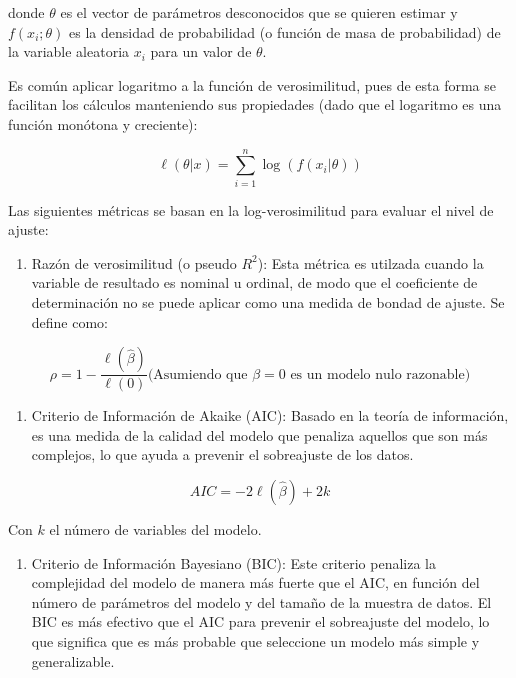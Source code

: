 \documentclass[
]{book}
\providecommand{\tightlist}{%
  \setlength{\itemsep}{0pt}\setlength{\parskip}{0pt}}
\begin{document}
donde \(θ\) es el vector de parámetros desconocidos que se quieren estimar
y \(f(x_i; θ)\) es la densidad de probabilidad (o función de masa de
probabilidad) de la variable aleatoria \(x_i\) para un valor de \(θ\).

Es común aplicar logaritmo a la función de verosimilitud, pues de esta
forma se facilitan los cálculos manteniendo sus propiedades (dado que el
logaritmo es una función monótona y creciente):

\[\ell(\theta | x) = \sum_{i=1}^{n} \log(f(x_i|\theta))\]

Las siguientes métricas se basan en la log-verosimilitud para evaluar el
nivel de ajuste:

\begin{enumerate}
\def\labelenumi{\arabic{enumi}.}
\tightlist
\item
  Razón de verosimilitud (o pseudo \(R^2\)): Esta métrica es utilzada
  cuando la variable de resultado es nominal u ordinal, de modo que el
  coeficiente de determinación no se puede aplicar como una medida de
  bondad de ajuste. Se define como:
\end{enumerate}

\[\rho = 1 - \frac{\ell(\hat{\beta})}{\ell(0)} \text{(Asumiendo que $\beta=0$ es un modelo nulo razonable)}\]

\begin{enumerate}
\def\labelenumi{\arabic{enumi}.}
\setcounter{enumi}{1}
\tightlist
\item
  Criterio de Información de Akaike (AIC): Basado en la teoría de
  información, es una medida de la calidad del modelo que penaliza
  aquellos que son más complejos, lo que ayuda a prevenir el
  sobreajuste de los datos.
\end{enumerate}

\[AIC = -2\ell({\hat{\beta}}) + 2k\]

Con \(k\) el número de variables del modelo.

\begin{enumerate}
\def\labelenumi{\arabic{enumi}.}
\setcounter{enumi}{2}
\tightlist
\item
  Criterio de Información Bayesiano (BIC): Este criterio penaliza la
  complejidad del modelo de manera más fuerte que el AIC, en función
  del número de parámetros del modelo y del tamaño de la muestra de
  datos. El BIC es más efectivo que el AIC para prevenir el
  sobreajuste del modelo, lo que significa que es más probable que
  seleccione un modelo más simple y generalizable.
\end{enumerate}
\end{document}
